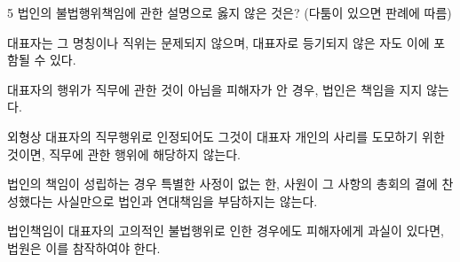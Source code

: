 \begin{question}{5}
법인의 불법행위책임에 관한 설명으로 옳지 않은 것은? (다툼이 있으면 판례에 따름)
\begin{choices}
  \item 대표자는 그 명칭이나 직위는 문제되지 않으며, 대표자로 등기되지 않은 자도 이에 포함될 수 있다.
  \item 대표자의 행위가 직무에 관한 것이 아님을 피해자가 안 경우, 법인은 책임을 지지 않는다.
  \item 외형상 대표자의 직무행위로 인정되어도 그것이 대표자 개인의 사리를 도모하기 위한 것이면, 직무에 관한 행위에 해당하지 않는다.
  \item 법인의 책임이 성립하는 경우 특별한 사정이 없는 한, 사원이 그 사항의 총회의 결에 찬성했다는 사실만으로 법인과 연대책임을 부담하지는 않는다. %
  \item 법인책임이 대표자의 고의적인 불법행위로 인한 경우에도 피해자에게 과실이 있다면, 법원은 이를 참작하여야 한다.
\end{choices}
\end{question}
